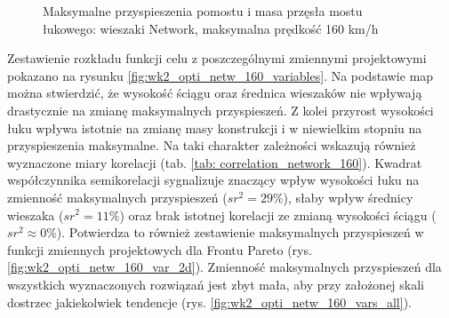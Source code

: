 \begin{figure}[hbt!]
	\centering
	\captionsetup{justification=centering}
	\caption{Maksymalne przyspieszenia pomostu i masa przęsła mostu łukowego: wieszaki Network, maksymalna prędkość 160 km/h}
	\label{fig:wk2_opti_netw_160_all}
\end{figure}

Zestawienie rozkładu funkcji celu z poszczególnymi zmiennymi projektowymi pokazano na rysunku \ref{fig:wk2_opti_netw_160_variables}. Na podstawie map można stwierdzić, że wysokość ściągu oraz średnica wieszaków nie wpływają drastycznie na zmianę maksymalnych przyspieszeń. Z kolei przyrost wysokości łuku wpływa istotnie na zmianę masy konstrukcji i w niewielkim stopniu na przyspieszenia maksymalne. Na taki charakter zależności wskazują również wyznaczone miary korelacji (tab. \ref{tab: correlation_network_160}). Kwadrat współczynnika semikorelacji sygnalizuje znaczący wpływ wysokości łuku na zmienność maksymalnych przyspieszeń ($sr^2=29\%$), słaby wpływ średnicy wieszaka ($sr^2 = 11\%$) oraz brak istotnej korelacji ze zmianą wysokości ściągu ($sr^2\approx 0 \%$). Potwierdza to również zestawienie maksymalnych przyspieszeń w funkcji zmiennych projektowych dla Frontu Pareto (rys. \ref{fig:wk2_opti_netw_160_var_2d}). Zmienność maksymalnych przyspieszeń dla wszystkich wyznaczonych rozwiązań jest zbyt mała, aby przy założonej skali dostrzec jakiekolwiek tendencje (rys. \ref{fig:wk2_opti_netw_160_vars_all}).

